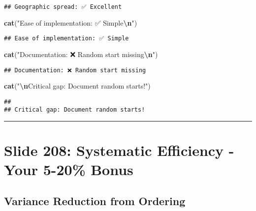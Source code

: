 \documentclass[
]{article}
\newenvironment{Shaded}{\begin{snugshade}}{\end{snugshade}}
\newcommand{\FunctionTok}[1]{\textcolor[rgb]{0.13,0.29,0.53}{\textbf{#1}}}
\newcommand{\NormalTok}[1]{#1}
\newcommand{\SpecialCharTok}[1]{\textcolor[rgb]{0.81,0.36,0.00}{\textbf{#1}}}
\newcommand{\StringTok}[1]{\textcolor[rgb]{0.31,0.60,0.02}{#1}}
\begin{document}
\begin{verbatim}
## Geographic spread: ✅ Excellent
\end{verbatim}

\begin{Shaded}
\begin{Highlighting}[]
\FunctionTok{cat}\NormalTok{(}\StringTok{"Ease of implementation: ✅ Simple}\SpecialCharTok{\textbackslash{}n}\StringTok{"}\NormalTok{)}
\end{Highlighting}
\end{Shaded}

\begin{verbatim}
## Ease of implementation: ✅ Simple
\end{verbatim}

\begin{Shaded}
\begin{Highlighting}[]
\FunctionTok{cat}\NormalTok{(}\StringTok{"Documentation: ❌ Random start missing}\SpecialCharTok{\textbackslash{}n}\StringTok{"}\NormalTok{)}
\end{Highlighting}
\end{Shaded}

\begin{verbatim}
## Documentation: ❌ Random start missing
\end{verbatim}

\begin{Shaded}
\begin{Highlighting}[]
\FunctionTok{cat}\NormalTok{(}\StringTok{"}\SpecialCharTok{\textbackslash{}n}\StringTok{Critical gap: Document random starts!"}\NormalTok{)}
\end{Highlighting}
\end{Shaded}

\begin{verbatim}
## 
## Critical gap: Document random starts!
\end{verbatim}

\begin{center}\rule{0.5\linewidth}{0.5pt}\end{center}

\section{Slide 208: Systematic Efficiency - Your 5-20\%
Bonus}\label{slide-208-systematic-efficiency---your-5-20-bonus}

\subsection{Variance Reduction from
Ordering}\label{variance-reduction-from-ordering}
\end{document}
